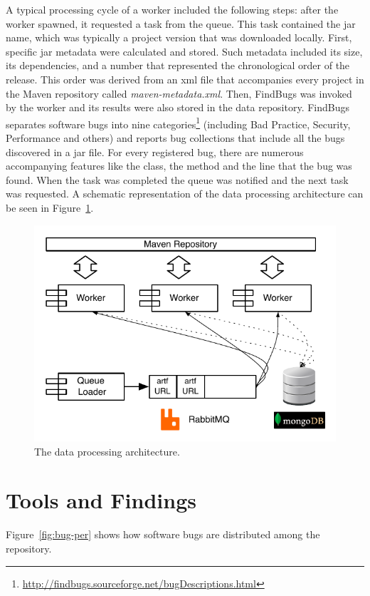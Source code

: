 \documentclass{sig-alternate}
\begin{document}
A typical processing cycle of a worker included the following steps: after
the worker spawned, it requested a task from the queue. This task contained
the {\sc jar} name, which was typically a project version that was downloaded locally.
First, specific {\sc jar} metadata were calculated and stored. Such metadata included
its size, its dependencies, and a number that represented the chronological order of the
release. This order was derived from an {\sc xml} file that
accompanies every project in the Maven repository called {\it
maven-metadata.xml}. Then, FindBugs was invoked by the worker and its results were
also stored in the data repository. 
FindBugs separates software bugs into nine
categories\footnote{\url{http://findbugs.sourceforge.net/bugDescriptions.html}}
(including Bad Practice, Security, Performance and others)
and reports bug collections that include all the bugs discovered in a
{\sc jar} file. For every registered bug, there are numerous accompanying features
like the class, the method and the line that the bug was found.
When the task was completed the queue
was notified and the next task was requested. A schematic representation of
the data processing architecture can be seen in Figure~\ref{fig:arch}.

\begin{figure} [h]
  \begin{center}
    \includegraphics[scale=0.73]{figures/arch.pdf}
  \end{center}
  \caption{The data processing architecture.}
  \label{fig:arch}
\end{figure}

\section{Tools and Findings}
\label{sec:find}
Figure~\ref{fig:bug-per} shows how software bugs are distributed among the
repository.
\end{document}
